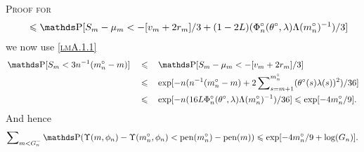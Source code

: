\begin{pro}{\textsc{Proof for } \\}
\begin{alignat*}{2}
& && \leq \P[S_{m} - \mu_{m} < - [v_{m} + 2 r_{m}]/3 + (1 - 2L)(\Phi_{n}^{\circ}(\theta^{\circ}, \lambda) \Lambda(m_{n}^{\circ})^{-1})/3 ]\\
\end{alignat*}
we now use \textsc{\cref{lmA.1.1}}
\begin{alignat*}{3}
&\P[S_{m} < 3 n^{-1} (m_{n}^{\circ} - m)] && \leq && \P[S_{m} - \mu_{m} < - [v_{m} + 2 r_{m}]/3]\\
& &&\leq&& \exp[- n(n^{-1}(m_{n}^{\circ} - m) + 2 \sum\nolimits_{s = m + 1}^{m_{n}^{\circ}}(\theta^{\circ}(s)\lambda(s))^{2})/36]\\
& &&\leq&& \exp[- n (16 L \Phi_{n}^{\circ}(\theta^{\circ}, \lambda) \Lambda(m_{n}^{\circ})^{-1})/36] \leq \exp [ - 4 m_{n}^{\circ}/9 ].
\end{alignat*}
And hence
\[\sum\nolimits_{m < G^{-}_{n}} \P(\Upsilon(m, \phi_{n}) - \Upsilon(m^{\circ}_{n}, \phi_{n}) < \pen(m^{\circ}_{n}) - \pen(m)) \leq\exp[- 4 m_{n}^{\circ}/9 + \log (G_{n})].\]
\proEnd
\end{pro}